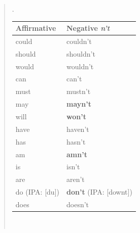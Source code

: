 \singlespacing
\begin{quote}
\ex.
\begin{tabular}[t]{| l | l |} \hline
Affirmative & Negative {\it n't}\\ \hline
could & couldn't\\
should & shouldn't\\
would & wouldn't\\
can & can't\\
must & mustn't\\
may & {\bf *mayn't}\\
will & {\bf won't}\\
have & haven't\\
has & hasn't\\
am & {\bf *amn't}\\
is & isn't\\
are & aren't\\
do \footnotesize{(IPA: [du])} & {\bf don't} \footnotesize{(IPA: [downt])}\\
does & doesn't\\ \hline
\end{tabular}\\

\end{quote}
\onehalfspacing

